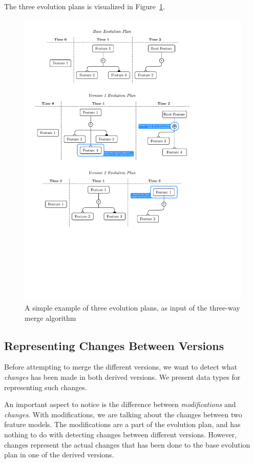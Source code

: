 \documentclass[a4paper,english]{ifimaster}
\begin{document}
The three evolution plans is visualized in Figure~\ref{fig:simple_three_way_example}. 

\begin{figure}[htpb]
  \centering
  \includegraphics[width=\linewidth]{simple_three_way_example.pdf}
  \caption{A simple example of three evolution plans, as input of the three-way merge algorithm}%
  \label{fig:simple_three_way_example}
\end{figure}

\subsection{Representing Changes Between Versions}%
\label{sub:representing_changes_between_versions}

Before attempting to merge the different versions, we want to detect what \textit{changes} has been made in both derived versions. We present data types for representing such changes.

An important aspect to notice is the difference between \textit{modifications} and \textit{changes}. With modifications, we are talking about the changes between two feature models. The modifications are a part of the evolution plan, and has nothing to do with detecting changes between different versions. However, changes represent the actual changes that has been done to the base evolution plan in one of the derived versions.
\end{document}
